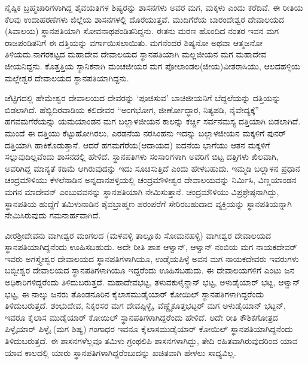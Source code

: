 ನೈಷ್ಠಿಕ ಬ್ರಹ್ಮಚಾರಿಗಳಾಗಿದ್ದ ಶೈವಯತಿಗಳ ಶಿಷ್ಯರನ್ನು ಶಾಸನಗಳು ಅವರ ಮಗ, ಮಕ್ಕಳು ಎಂದು ಕರೆದಿವೆ. ಈ ರೀತಿಯ ಕೆಲವು ಉದಾಹರಣೆಗಳು ಜಿಲ್ಲೆಯ ಶಾಸನಗಳಲ್ಲಿ ದೊರೆಯುತ್ತವೆ. ಮುದಿಗೆರೆಯ ಬಾರಂದೇಶ್ವರ ದೇವಾಲಯದ (ಸಿವಾಲಯ) ಸ್ಥಾನಪತಿಯಾಗಿ ಸೋವನಾಥಪಂಡಿತನಿದ್ದನು. ಈತನು ಮರಣ ಹೊಂದಿದ ನಂತರ ಇವನ ಮಗ ರಾಜಪಂಡಿತನಿಗೆ ಈ ದತ್ತಿಯನ್ನು ವರ್ಗಾಯಿಸಲಾಯಿತು. ಮಗನೆಂದರೆ ಶಿಷ್ಯನೋ ಅಥವಾ ಆತ್ಮಜನೋ ತಿಳಿಯದು.ನಾಗರಕಟ್ಟದ ಮಹಾದೇವ ದೇವಾಲಯದ ಸ್ಥಾನಪತಿಯಾಗಿ ಮಲ್ಲಜೀಯನ ಮಗ ಮಹಾದೇವ ಜೀಯನಿದ್ದನು. ಕೊತ್ತತ್ತಿಯ ಸ್ಥಾನಿಕನಾಗಿ ಮಂಚಜೀಯರ ಮಗ ಪೋಲಾಂಡಲ(ಜೀಯ)ವೀತರಾಸಿಯು, ಆಲದಹಳ್ಳಿಯ ಮಲ್ಲೇಶ್ವರ ದೇವಾಲಯದ ಸ್ಥಾನಪತಿಯಾಗಿ\-ದ್ದನು.

ಜೆಟ್ಟಿಗದಲ್ಲಿ ಹೇಮೇಶ್ವರ ದೇವಾಲಯದ ದೇವರನ್ನು ‘ಪೂಜಿಸುವ’ ಬಾಚಿಜೀಯನಿಗೆ ಬೆದ್ದಲೆಯನ್ನು ದತ್ತಿಯನ್ನು ಬಿಡಲಾಗಿದೆ. ಹೆಬ್ಬಿದಿರವಾಡಿಯ ಕಲಿದೇವರ “ಅಂಗಭೋಗ, ಜೀರ್ಣೋದ್ಧಾರ, ನಿತ್ಯಪಡಿ, ನೈವೇದ್ಯಕ್ಕೆ” ಹಗವಮಗೆರೆಯನ್ನು ಯಮಯಾಂಡನ ಮಗ ಬಲ್ಲಾಳಜೀಯನ ಕಾಲನ್ನು ಕರ್ಚ್ಚಿ ಸರ್ವನಮಸ್ಯ ದತ್ತಿಯಾಗಿ ಬಿಡಲಾಗಿದೆ. ಮುಂದೆ ಈ ದತ್ತಿಯು ಕೆಟ್ಟುಹೋಗಿರಲು, ಎರಡನೆಯ ನರಸಿಂಹನು ಇದನ್ನು ಬಲ್ಲಾಳಜೀಯನ ಮಕ್ಕಳಿಗೆ ಪುನರ್​ ದತ್ತಿಯಾಗಿ ಹಾಕಿಕೊಡುತ್ತಾನೆ. ಆದರೆ ಹಗಮಗೆರೆಯ(ಆದಾಯದ) ಐದನೆಯ ಭಾಗೆಯು ಆತನ ಮಕ್ಕಳಿಗೆ ಸಲ್ಲುವುದಿಲ್ಲವೆಂದು ಶಾಸನದಲ್ಲಿ ಹೇಳಿದೆ. ಸ್ಥಾನಪತಿಗಳು ಸಂಸಾರಿಗಳಾಗಿ ಅವರಿಗೆ ಬಿಟ್ಟ ದತ್ತಿಗಳು ಖಿಲವಾಗಿ, ಅವರಿಗಿದ್ದ ಮಾನ್ಯತೆ ಕಡಿಮೆ ಆಗಿರುವುದನ್ನು ಇದು ಸೂಚಿಸುತ್ತಿದೆ ಎಂದು ಹೇಳಬಹುದು. ಇಮ್ಮಡಿ ಬಲ್ಲಾಳನ ಪ್ರಧಾನ ಚಂದ್ರಮೌಳಿಯು ಕೆಳಲೆನಾಡಿನ ಅನ್ನದಾನಪಳ್ಳಿಯಲ್ಲಿ ಚಂದ್ರಮೌಳೀಶ್ವರ ದೇವಾಲಯವನ್ನು ನಿರ್ಮಿಸಿ, ವಿಣ್ಣಯಾಂಡನ ಮಗನ ಮಾದೇವನ್​ ಎಂಬುವವನನ್ನು ಸ್ಥಾನಪತಿಯಾಗಿ ನೇಮಿಸುತ್ತಾನೆ. ಚಂದ್ರಮೌಳಿಯು ವಿಪ್ರಶ್ರೇಷ್ಠನಾಗಿದ್ದು, ಸ್ಥಾನಪತಿಯ ಹುದ್ದೆಗೆ ತಮಿಳುನಾಡಿನ ಶೈವಬ್ರಾಹ್ಮಣ ಪರಂಪರೆಗೆ ಸೇರಿರಬಹುದಾದ ವ್ಯಕ್ತಿಯನ್ನು ಸ್ಥಾನಪತಿಯನ್ನಾಗಿ ನೇಮಿಸಿರುವುದು ಗಮನಾರ್ಹವಾಗಿದೆ.

ವೀರಶ‍್ರೀದೇವನು ವಾಗೀಶ್ವರ ಮಂಗಲದ (ಮಳವಳ್ಳಿ ತಾಲ್ಲೂಕು ಸೋಮನಹಳ್ಳಿ) ವಾಗೀಶ್ವರ ದೇವಾಲಯದ ಸ್ಥಾನಪತಿಯಾಗಿದ್ದನೆಂದು ಊಹಿಸಬಹುದು. ಅದೇ ರೀತಿ ಪಾಶ ಆಳ್ವಾನ್​, ಆಳ್ವಾನ್​ ನಂಬಿಯ ಮಗ ನಾಯಕದೇವರ್​ ಇವರು ಅಗಸ್ತ್ಯೇಶ್ವರ ದೇವಾಲಯದ ಸ್ಥಾನಪತಿಗಳಾಗಿಯೂ, ಉಡೈಯಪಿಳ್ಳೆ ಅವನ ಮಗ ನಾಯಕದೇವರು ಇವರುಗಳು ಬಬ್ಬೀಶ್ವರ ದೇವಾಲಯದ ಸ್ಥಾನಪತಿಗಳಾಗಿಯೂ ಇದ್ದರೆಂದು ಊಹಿಸಬಹುದು. ಈ ದೇವಾಲಯಗಳಿಗೆ ಎಂಟು ಜನ ಅಧಿಕಾರಿಗಳಿದ್ದರೆಂದು ತಿಳಿದು\-ಬರುತ್ತದೆ. ಮಹಾದೇವಭಟ್ಟ, ತಳುವಕುಳೈನ್ದಾನ್​ ಭಟ್ಟ, ಅಳುಡೈಯಾರ್​ ಭಟ್ಟ, ಆಳ್ವಾನ್​ ಭಟ್ಟ, ಈ ನಾಲ್ಕು ಜನರು ತೊಂಡನೂರಿನ ಕೈಲಾಸಮುಡೈಯಾರ್​ ಕೋಯಿಲ್​ ಸ್ಥಾನಪತಿಗಳಾಗಿದ್ದರೆಂದು ತಿಳಿದುಬರುತ್ತದೆ. ಶಂಭುದೇವ, ನಿಕ್ಕರಸರ ಮಗ ದೇವಪ್ಪಿಳ್ಳೈ, ವೆಣ್ಣೈಕೂತ್ತಭಟ್ಟರ್​ ಮಗ ಅಳುಡೈಯಾನ್​ ಭಟ್ಟನ್​, ಇವರೂ ಕೈಲಾಸ ಮುಡೈಯಾರ್​ ಕೋಯಿಲ್​ ಸ್ಥಾನಪತಿಗಳಾಗಿದ್ದರೆಂದು ಹೇಳಿದೆ. ಅದೇ ರೀತಿ ಕೌಶಿಕಗೋತ್ರದ ಪಿಳ್ಳೈಯಾರ್​ ಪಿಳ್ಳೈ (ಮಗ \enginline{-} ಶಿಷ್ಯ) ಗಂಗಾಧರ ಇವನೂ ಕೈಲಾಸಮುಡೈಯಾರ್​ ಕೋಯಿಲ್​ ಸ್ಥಾನಪತಿಯಾಗಿದ್ದನೆಂದು ತಿಳಿದುಬರುತ್ತದೆ. ಈ ಶಾಸನಗಳೆಲ್ಲವೂ ತಮಿಳು ಗ್ರಂಥಲಿಪಿ ಶಾಸನಗಳಾಗಿದ್ದು, ತೇದಿ ರಹಿತವಾಗಿರುವುದರಿಂದ ಯಾವ ಯಾವ ಕಾಲದಲ್ಲಿ ಯಾರು ಸ್ಥಾನಪತಿಗಳಾಗಿದ್ದರೆಂಬುದನ್ನು ಖಚಿತವಾಗಿ ಹೇಳಲು ಸಾಧ್ಯವಿಲ್ಲ.

